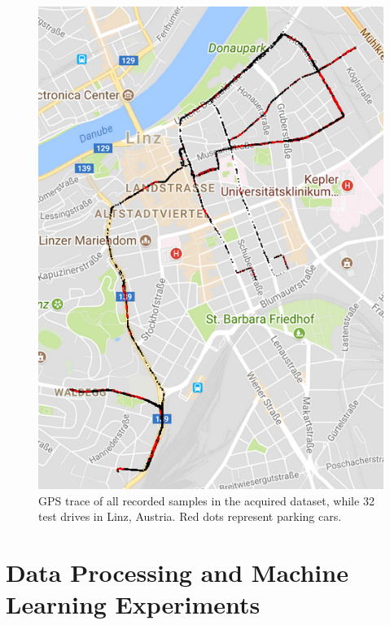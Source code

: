 \begin{figure}
	\centering
	\includegraphics{img/gps_data_recorded_data_parking_spaces.PNG}
	\caption{GPS trace of all recorded samples in the acquired dataset, while 32 test drives in Linz, Austria. Red dots represent parking cars.}
	\label{fig:gps_locations_dataset}
\end{figure}


















\chapter{Data Processing and Machine Learning Experiments}
\label{chap:data_processing_and_ml}

